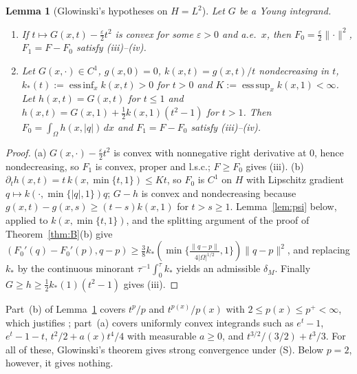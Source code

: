\documentclass[11pt]{amsart}
\newtheorem{lemma}[theorem]{Lemma}
\theoremstyle{definition}
\theoremstyle{remark}
\numberwithin{equation}{section}
\newcommand{\dx}{\,dx}
\newcommand{\abs}[1]{\lvert #1\rvert}
\newcommand{\norm}[1]{\lVert #1\rVert}
\DeclareMathOperator*{\esssup}{ess\,sup}
\DeclareMathOperator*{\essinf}{ess\,inf}
\begin{document}
\begin{lemma}[Glowinski's hypotheses on $H=L^2$]\label{lem:split}
Let $G$ be a Young integrand.
\begin{enumerate}[label=\textup{(\alph*)}]
\item If $t\mapsto G(x,t)-\frac\varepsilon2t^2$ is convex for some $\varepsilon>0$ and a.e.\ $x$, then $F_0=\frac\varepsilon2\norm\cdot^2$, $F_1=F-F_0$ satisfy \textup{(iii)--(iv)}.
\item Let $G(x,\cdot)\in C^1$, $g(x,0)=0$, $k(x,t)=g(x,t)/t$ nondecreasing in $t$, $k_*(t):=\essinf_xk(x,t)>0$ for $t>0$ and $K:=\esssup_xk(x,1)<\infty$. Let $h(x,t)=G(x,t)$ for $t\le1$ and $h(x,t)=G(x,1)+\frac12k(x,1)(t^2-1)$ for $t>1$. Then $F_0=\int_\Omega h(x,\abs q)\dx$ and $F_1=F-F_0$ satisfy \textup{(iii)--(iv)}.
\end{enumerate}
\end{lemma}
\begin{proof}
(a) $G(x,\cdot)-\frac\varepsilon2t^2$ is convex with nonnegative right derivative at $0$, hence nondecreasing, so $F_1$ is convex, proper and l.s.c.; $F\ge F_0$ gives (iii). (b) $\partial_th(x,t)=t\,k(x,\min\{t,1\})\le Kt$, so $F_0$ is $C^1$ on $H$ with Lipschitz gradient $q\mapsto k(\cdot,\min\{\abs q,1\})q$; $G-h$ is convex and nondecreasing because $g(x,t)-g(x,s)\ge(t-s)k(x,1)$ for $t>s\ge1$. Lemma~\ref{lem:psi} below, applied to $k(x,\min\{t,1\})$, and the splitting argument of the proof of Theorem~\ref{thm:B}(b) give $(F_0'(q)-F_0'(p),q-p)\ge\frac38k_*(\min\{\frac{\norm{q-p}}{4\abs\Omega^{1/2}},1\})\norm{q-p}^2$, and replacing $k_*$ by the continuous minorant $\tau^{-1}\int_0^\tau k_*$ yields an admissible $\delta_M$. Finally $G\ge h\ge\frac12k_*(1)(t^2-1)$ gives (iii).
\end{proof}

Part~(b) of Lemma~\ref{lem:split} covers $t^p/p$ and $t^{p(x)}/p(x)$ with $2\le p(x)\le p^+<\infty$, which justifies \cite[Thm.~4.3]{AragonFBRubio2023}; part~(a) covers uniformly convex integrands such as $e^t-1$, $e^t-1-t$, $t^2/2+a(x)t^4/4$ with measurable $a\ge0$, and $t^{3/2}/(3/2)+t^3/3$. For all of these, Glowinski's theorem gives strong convergence under (S). Below $p=2$, however, it gives nothing.
\end{document}

